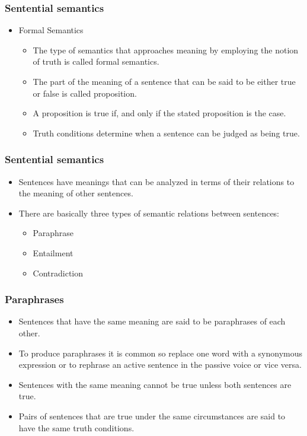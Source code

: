 \documentclass[12pt, table]{beamer}
\begin{document}
\begin{frame}
\frametitle{Sentential semantics}
\begin{itemize}
\item Formal Semantics
\begin{itemize}
\item The type of semantics that approaches meaning by employing the notion of truth is called formal semantics.
\item The part of the meaning of a sentence that can be said to be either true or false is called proposition.
\item A proposition is true if, and only if the stated proposition is the case.
\item Truth conditions determine when a sentence can be judged as being true.
\end{itemize}
\end{itemize}
\end{frame}

\begin{frame}
\frametitle{Sentential semantics}
\begin{itemize}
\item Sentences have meanings that can be analyzed in terms of their relations to the meaning of other sentences. 
\item There are basically three types of semantic relations between sentences:
\begin{itemize}
\item Paraphrase
\item Entailment
\item Contradiction
\end{itemize}
\end{itemize}
\end{frame}

\begin{frame}
\frametitle{Paraphrases}
\begin{itemize}
\item Sentences that have the same meaning are said to be paraphrases of each other.
\item To produce paraphrases it is common so replace one word with a synonymous expression or to rephrase an active sentence in the passive voice or vice versa.
\item Sentences with the same meaning cannot be true unless both sentences are true. 
\item Pairs of sentences that are true under the same circumstances are said to have the same truth conditions.
\end{itemize}
\end{frame}
\end{document}
